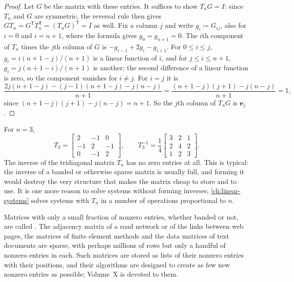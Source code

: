 \begin{proof}
Let $G$ be the matrix with these entries. It suffices to show $T_nG=I$: since $T_n$ and $G$ are symmetric, the reversal rule then gives $GT_n=G^{\mathsf T}T_n^{\mathsf T}=(T_nG)^{\mathsf T}=I$ as well. Fix a column $j$ and write $g_i\coloneqq G_{ij}$, also for $i=0$ and $i=n+1$, where the formula gives $g_0=g_{n+1}=0$. The $i$th component of $T_n$ times the $j$th column of $G$ is $-g_{i-1}+2g_i-g_{i+1}$. For $0\le i\le j$, $g_i=i(n+1-j)/(n+1)$ is a linear function of $i$, and for $j\le i\le n+1$, $g_i=j(n+1-i)/(n+1)$ is another; the second difference of a linear function is zero, so the component vanishes for $i\ne j$. For $i=j$ it is
\[
\frac{2j(n+1-j)-(j-1)(n+1-j)-j(n-j)}{n+1}=\frac{(n+1-j)(j+1)-j(n-j)}{n+1}=1 ,
\]
since $(n+1-j)(j+1)-j(n-j)=n+1$. So the $j$th column of $T_nG$ is $\mathbf e_j$.
\end{proof}

For $n=3$,
\[
T_3=\begin{bmatrix}2&-1&0\\-1&2&-1\\0&-1&2\end{bmatrix},\qquad T_3^{-1}=\frac14\begin{bmatrix}3&2&1\\2&4&2\\1&2&3\end{bmatrix}.
\]
The inverse of the tridiagonal matrix $T_n$ has no zero entries at all. This is typical: the inverse of a banded or otherwise sparse matrix is usually full, and forming it would destroy the very structure that makes the matrix cheap to store and to use. It is one more reason to solve systems without forming inverses; \cref{ch:linear-systems} solves systems with $T_n$ in a number of operations proportional to $n$.

Matrices with only a small fraction of nonzero entries, whether banded or not, are called . The adjacency matrix of a road network or of the links between web pages, the matrices of finite element methods and the data matrices of text documents are sparse, with perhaps millions of rows but only a handful of nonzero entries in each. Such matrices are stored as lists of their nonzero entries with their positions, and their algorithms are designed to create as few new nonzero entries as possible; Volume~X is devoted to them.

